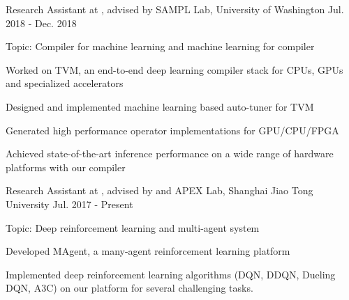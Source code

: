 

\begin{cventries}

\cventry
	{Research Assistant at , advised by } %
	{SAMPL Lab, University of Washington} %
	{Jul. 2018 - Dec. 2018} %
	{} %
	{
		\begin{cvitems} %
			\item{Topic: Compiler for machine learning and machine learning for compiler}
			\item {Worked on TVM, an end-to-end deep learning compiler stack for CPUs, GPUs and specialized accelerators
			}
			\item {Designed and implemented machine learning based auto-tuner for TVM}
			\item {Generated high performance operator implementations for GPU/CPU/FPGA}
			\item {Achieved state-of-the-art inference performance on a wide range of hardware platforms with our compiler}
		\end{cvitems}
}

\cventry
    {Research Assistant at , advised by  and } %
    {APEX Lab, Shanghai Jiao Tong University} %
    {Jul. 2017 - Present} %
    {} %
    {
      \begin{cvitems} %
      \item{Topic: Deep reinforcement learning and multi-agent system}
      \item {Developed MAgent, a many-agent reinforcement learning platform}
      \item {Implemented deep reinforcement learning algorithms (DQN, DDQN, Dueling DQN, A3C) on our platform for several challenging tasks.}
      \end{cvitems}
    }
\end{cventries}

